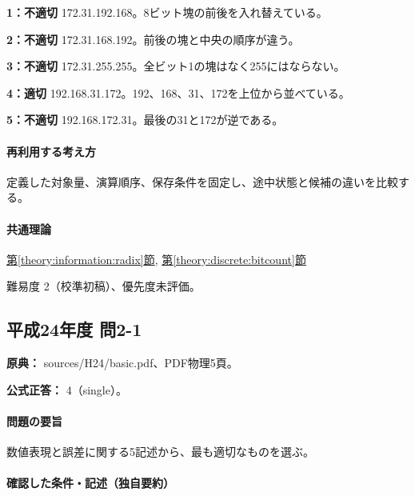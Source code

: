 \noindent\textbf{1：不適切} 172.31.192.168。8ビット塊の前後を入れ替えている。\par

\noindent\textbf{2：不適切} 172.31.168.192。前後の塊と中央の順序が違う。\par

\noindent\textbf{3：不適切} 172.31.255.255。全ビット1の塊はなく255にはならない。\par

\noindent\textbf{4：適切} 192.168.31.172。192、168、31、172を上位から並べている。\par

\noindent\textbf{5：不適切} 192.168.172.31。最後の31と172が逆である。\par

\paragraph{再利用する考え方} 定義した対象量、演算順序、保存条件を固定し、途中状態と候補の違いを比較する。

\paragraph{共通理論} \hyperref[theory:information:radix]{第\ref*{theory:information:radix}節}, \hyperref[theory:discrete:bitcount]{第\ref*{theory:discrete:bitcount}節}

\par 難易度 2（校準初稿）、優先度未評価。

\subsection{平成24年度 問2-1}
\label{q:h24-reg-basic-2-1}

\noindent\textbf{原典：} sources/H24/basic.pdf、PDF物理5頁。

\textbf{公式正答：} 4（single）。

\paragraph{問題の要旨} 数値表現と誤差に関する5記述から、最も適切なものを選ぶ。

\paragraph{確認した条件・記述（独自要約）}\mbox{}\par

